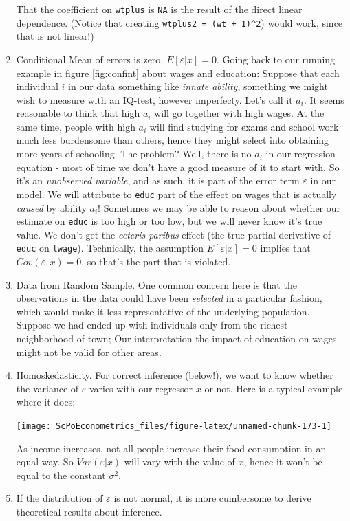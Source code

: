 \documentclass[]{book}
\begin{document}
\begin{enumerate}
  That the coefficient on \texttt{wtplus} is \texttt{NA} is the result of the direct linear dependence. (Notice that creating \texttt{wtplus2\ =\ (wt\ +\ 1)\^{}2}) would work, since that is not linear!)
\item
  Conditional Mean of errors is zero, \(E[\varepsilon|x] = 0\). Going back to our running example in figure \ref{fig:confint} about wages and education: Suppose that each individual \(i\) in our data something like \emph{innate ability}, something we might wish to measure with an IQ-test, however imperfecty. Let's call it \(a_i\). It seems reasonable to think that high \(a_i\) will go together with high wages. At the same time, people with high \(a_i\) will find studying for exams and school work much less burdensome than others, hence they might select into obtaining more years of schooling. The problem? Well, there is no \(a_i\) in our regression equation - most of time we don't have a good measure of it to start with. So it's an \emph{unobserved variable}, and as such, it is part of the error term \(\varepsilon\) in our model. We will attribute to \texttt{educ} part of the effect on wages that is actually \emph{caused} by ability \(a_i\)! Sometimes we may be able to reason about whether our estimate on \texttt{educ} is too high or too low, but we will never know it's true value. We don't get the \emph{ceteris paribus} effect (the true partial derivative of \texttt{educ} on \texttt{lwage}). Technically, the assumption \(E[\varepsilon|x] = 0\) implies that \(Cov(\varepsilon,x) = 0\), so that's the part that is violated.
\item
  Data from Random Sample. One common concern here is that the observations in the data could have been \emph{selected} in a particular fashion, which would make it less representative of the underlying population. Suppose we had ended up with individuals only from the richest neighborhood of town; Our interpretation the impact of education on wages might not be valid for other areas.
\item
  Homoskedasticity. For correct inference (below!), we want to know whether the variance of \(\varepsilon\) varies with our regressor \(x\) or not. Here is a typical example where it does:

  \begin{center}\texttt{[image: ScPoEconometrics\_files/figure-latex/unnamed-chunk-173-1]} \end{center}

  As income increases, not all people increase their food consumption in an equal way. So \(Var(\varepsilon|x)\) will vary with the value of \(x\), hence it won't be equal to the constant \(\sigma^2\).
\item
  If the distribution of \(\varepsilon\) is not normal, it is more cumbersome to derive theoretical results about inference.
\end{enumerate}
\end{document}
